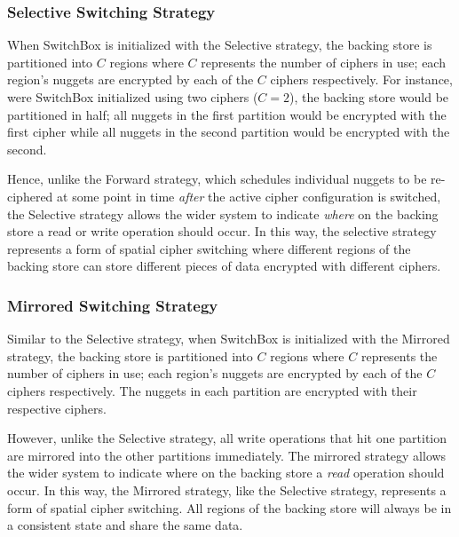 \subsubsection{Selective Switching Strategy}

When SwitchBox is initialized with the Selective strategy, the backing store is
partitioned into $C$ regions where $C$ represents the number of ciphers in use;
each region's nuggets are encrypted by each of the $C$ ciphers respectively. For
instance, were SwitchBox initialized using two ciphers ($C = 2$), the backing
store would be partitioned in half; all nuggets in the first partition would be
encrypted with the first cipher while all nuggets in the second partition would
be encrypted with the second.

Hence, unlike the Forward strategy, which schedules individual nuggets to be
re-ciphered at some point in time \emph{after} the active cipher configuration
is switched, the Selective strategy allows the wider system to indicate
\emph{where} on the backing store a read or write operation should occur. In
this way, the selective strategy represents a form of spatial cipher switching
where different regions of the backing store can store different pieces of data
encrypted with different ciphers.

\subsubsection{Mirrored Switching Strategy}

Similar to the Selective strategy, when SwitchBox is initialized with the
Mirrored strategy, the backing store is partitioned into $C$ regions where $C$
represents the number of ciphers in use; each region's nuggets are encrypted by
each of the $C$ ciphers respectively. The nuggets in each partition are
encrypted with their respective ciphers.

However, unlike the Selective strategy, all write operations that hit one
partition are mirrored into the other partitions immediately. The mirrored
strategy allows the wider system to indicate where on the backing store a
\emph{read} operation should occur. In this way, the Mirrored strategy, like the
Selective strategy, represents a form of spatial cipher switching. All regions
of the backing store will always be in a consistent state and share the same
data.


